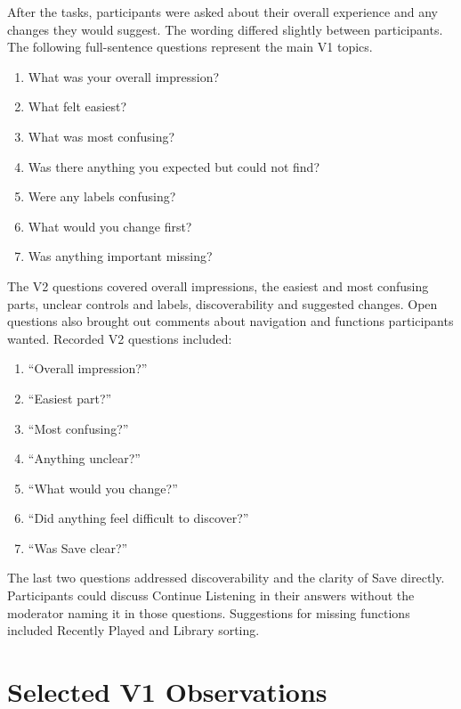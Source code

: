 After the tasks, participants were asked about their overall experience and any changes they would suggest. The wording differed slightly between participants. The following full-sentence questions represent the main V1 topics.

\begin{enumerate}
  \setlength{\itemsep}{2pt}
  \setlength{\parsep}{0pt}
  \item What was your overall impression?
  \item What felt easiest?
  \item What was most confusing?
  \item Was there anything you expected but could not find?
  \item Were any labels confusing?
  \item What would you change first?
  \item Was anything important missing?
\end{enumerate}

The V2 questions covered overall impressions, the easiest and most confusing parts, unclear controls and labels, discoverability and suggested changes. Open questions also brought out comments about navigation and functions participants wanted. Recorded V2 questions included:

\begin{enumerate}
  \setlength{\itemsep}{2pt}
  \setlength{\parsep}{0pt}
  \item ``Overall impression?''
  \item ``Easiest part?''
  \item ``Most confusing?''
  \item ``Anything unclear?''
  \item ``What would you change?''
  \item ``Did anything feel difficult to discover?''
  \item ``Was Save clear?''
\end{enumerate}

The last two questions addressed discoverability and the clarity of Save directly. Participants could discuss Continue Listening in their answers without the moderator naming it in those questions. Suggestions for missing functions included Recently Played and Library sorting.

\section{Selected V1 Observations}

